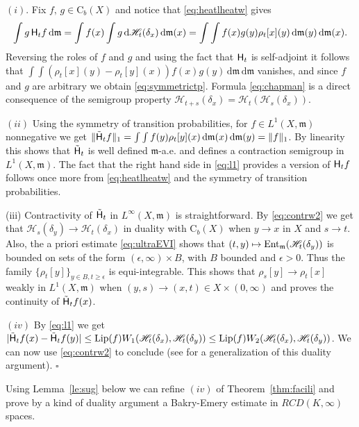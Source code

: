 \documentclass[reqno,11pt]{article}
\numberwithin{equation}{section}
\newcommand{\C}{\mathbb{C}}
\newcommand{\mm}{{\mbox{\boldmath$m$}}}
\renewcommand{\d}{{\mathrm d}}
\newenvironment{proof}{\removelastskip\par\medskip   %
\noindent{\em Proof.}
\rm}{\penalty-20\null\hfill$\square$\par\medbreak}
\renewcommand{\C}{{\rm Ch}}
\newcommand{\entr}[2]{{\rm Ent}_{#2}(#1)}              %
\newcommand{\rcd}[2]{RCD(#1,#2)}
\newcommand{\heatl}{{\sf H}}
\newcommand{\heatw}{{\mathscr H}}
\newcommand{\ke}[2]{\heatw_{#2}(\delta_{#1})}
\newcommand{\ked}[2]{\rho_{#2}[#1]}\renewcommand{\C}{{\sf Ch}}
\newcommand{\Cb}{\mathrm C_b}
\renewcommand{\mm}{\mathfrak m}
\begin{document}
\begin{proof} $(i)$. Fix $f,\,g\in \Cb(X)$ and notice that \eqref{eq:heatlheatw}
gives
$$
\int g\,\heatl_t f\,\d\mm=\int f(x)\int g\,\d\ke xt\,\d\mm(x)=
\int\int f(x)g(y)\ked xt (y)\,\d\mm(y)\,\d\mm(x).
$$
Reversing the roles of $f$ and $g$ and using the fact that
$\heatl_t$ is self-adjoint it follows that $\int\int (\ked xt
(y)-\ked yt (x))f(x)g(y)\,\d\mm\,\d\mm$ vanishes, and since $f$ and
$g$ are arbitrary we obtain \eqref{eq:symmetrictp}. Formula
\eqref{eq:chapman} is a direct consequence of the semigroup property
$\heatw_{t+s}(\delta_x)=\heatw_t(\heatw_s(\delta_x))$.

\noindent $(ii)$ Using the symmetry of transition probabilities, for
$f\in L^1(X,\mm)$ nonnegative we get $\|\tilde\heatl_tf\|_1=\int\int
f(y)\ked yt (x)\,\d\mm(x)\,\d\mm(y)=\|f\|_1$. By linearity this
shows that $\tilde\heatl_t$ is well defined $\mm$-a.e. and defines a
contraction semigroup in $L^1(X,\mm)$. The fact that the right hand
side in \eqref{eq:l1} provides a version of $\heatl_tf$ follows once
more from \eqref{eq:heatlheatw} and the symmetry of transition
probabilities.

\noindent (iii) Contractivity of $\tilde\heatl_t$ in
$L^\infty(X,\mm)$ is straightforward. By \eqref{eq:contrw2} we get
that $\ke ys\to\ke xt$ in duality with $\Cb(X)$ when $y\to x$ in $X$
and $s\to t$. Also, the a priori estimate \eqref{eq:ultraEVI} shows
that $(t,y)\mapsto\entr{\ke yt}\mm$ is bounded on sets of the form
$(\epsilon,\infty)\times B$, with $B$ bounded and $\epsilon>0$. Thus
the family $\{\ked yt\}_{y\in B,t\geq\epsilon}$ is equi-integrable.
This shows that $\ked ys\to\ked xt$ weakly in $L^1(X,\mm)$ when
$(y,s)\to (x,t)\in X\times (0,\infty)$ and proves the continuity of
$\tilde\heatl_tf(x)$.

\noindent $(iv)$ By \eqref{eq:l1} we get $|\tilde\heatl_t
f(x)-\tilde\heatl_t f(y)|\leq {\rm Lip}(f)W_1(\ke xt,\ke yt)\leq
{\rm Lip}(f)W_2(\ke xt,\ke yt)$. We can now use \eqref{eq:contrw2}
to conclude (see \cite{Kuwada10} for a generalization of this
duality argument).
\end{proof}

Using Lemma~\ref{le:sug} below we can refine $(iv)$ of
Theorem~\ref{thm:facili} and prove by a kind of duality argument
\cite{Kuwada10} a Bakry-Emery estimate in $\rcd K\infty$ spaces.
\end{document}
